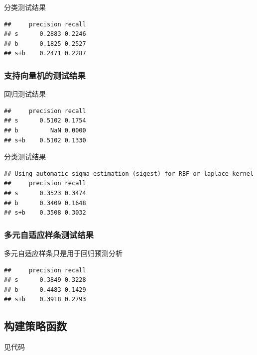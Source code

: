 \documentclass{article}\usepackage[]{graphicx}\usepackage[]{color}
\makeatletter
\newenvironment{kframe}{%
 \def\at@end@of@kframe{}%
 \ifinner\ifhmode%
  \def\at@end@of@kframe{\end{minipage}}%
  \begin{minipage}{\columnwidth}%
 \fi\fi%
 \def\FrameCommand##1{\hskip\@totalleftmargin \hskip-\fboxsep
 \colorbox{shadecolor}{##1}\hskip-\fboxsep
     \hskip-\linewidth \hskip-\@totalleftmargin \hskip\columnwidth}%
 \MakeFramed {\advance\hsize-\width
   \@totalleftmargin\z@ \linewidth\hsize
   \@setminipage}}%
 {\par\unskip\endMakeFramed%
 \at@end@of@kframe}
\newenvironment{knitrout}{}{} %
\makeatother
\begin{document}
\begin{CJK*}{UTF8}{gkai}
分类测试结果
\begin{knitrout}
\color{fgcolor}\begin{kframe}
\begin{verbatim}
##     precision recall
## s      0.2883 0.2246
## b      0.1825 0.2527
## s+b    0.2471 0.2287
\end{verbatim}
\end{kframe}
\end{knitrout}
\subsubsection{支持向量机的测试结果}
回归测试结果
\begin{knitrout}
\color{fgcolor}\begin{kframe}
\begin{verbatim}
##     precision recall
## s      0.5102 0.1754
## b         NaN 0.0000
## s+b    0.5102 0.1330
\end{verbatim}
\end{kframe}
\end{knitrout}

分类测试结果
\begin{knitrout}
\color{fgcolor}\begin{kframe}
\begin{verbatim}
## Using automatic sigma estimation (sigest) for RBF or laplace kernel
##     precision recall
## s      0.3523 0.3474
## b      0.3409 0.1648
## s+b    0.3508 0.3032
\end{verbatim}
\end{kframe}
\end{knitrout}
\subsubsection{多元自适应样条测试结果}
多元自适应样条只是用于回归预测分析
\begin{knitrout}
\color{fgcolor}\begin{kframe}
\begin{verbatim}
##     precision recall
## s      0.3849 0.3228
## b      0.4483 0.1429
## s+b    0.3918 0.2793
\end{verbatim}
\end{kframe}
\end{knitrout}
\subsection{构建策略函数}
见代码




\end{CJK*}
\end{document}
